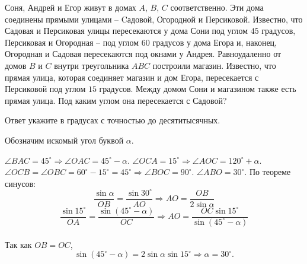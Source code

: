
Соня, Андрей и Егор живут в домах $A$, $B$, $C$ соответственно. 
Эти дома соединены прямыми улицами -- Cадовой, Огородной и Персиковой. 
Известно, что Садовая и Персиковая улицы пересекаются у дома Сони под углом $45$ градусов, 
Персиковая и Огородная -- под углом $60$ градусов у дома Егора и, наконец, 
Огородная и Садовая пересекаются под окнами у Андрея. Равноудаленно от домов $B$ и $C$ внутри 
треугольника $ABC$ построили магазин. Известно, что прямая улица, которая соединяет магазин и дом Егора, 
пересекается с Персиковой под углом $15$ градусов. 
Между домом Сони и магазином также есть прямая улица. Под каким углом она пересекается с Садовой?

Ответ укажите в градусах с точностью до десятитысячных.

\soultionSection

Обозначим искомый угол буквой $\alpha$. 


$\angle BAC = 45^\circ \Rightarrow \angle OAC = 45^\circ - \alpha$. 
$\angle OCA = 15^\circ \Rightarrow \angle AOC = 120^\circ + \alpha$. \linebreak
$\angle OCB = \angle OBC = 60^\circ - 15^\circ = 45^\circ \Rightarrow \angle BOC = 90^\circ$. 
$\angle ABO = 30^\circ$. По теореме синусов:
$$\frac{\sin\alpha}{OB} = \frac{\sin 30^\circ}{AO} \Rightarrow AO = \frac{OB}{2\sin\alpha}$$
$$\frac{\sin 15^\circ}{OA} = \frac{\sin (45^\circ - \alpha)}{OC} \Rightarrow AO = \frac{OC\sin 15^\circ}{\sin (45^\circ - \alpha)}$$ \\
Так как $OB = OC$, 
$$\sin (45^\circ - \alpha) = 2\sin\alpha \sin 15^\circ \Rightarrow \alpha = 30^\circ.$$

